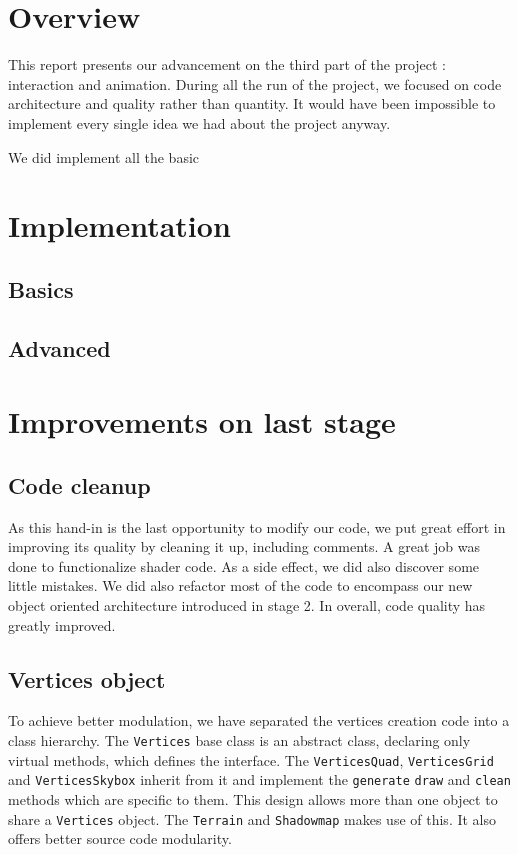 \documentclass[a4paper,11pt]{article}
\begin{document}
\section{Overview}

This report presents our advancement on the third part of the project : interaction and animation. During all the run of the project, we focused on code architecture and quality rather than quantity. It would have been impossible to implement every single idea we had about the project anyway.

We did implement all the basic

\section{Implementation}

\subsection{Basics}

\subsection{Advanced}


\section{Improvements on last stage}

\subsection{Code cleanup}

As this hand-in is the last opportunity to modify our code, we put great effort in improving its quality by cleaning it up, including comments. A great job was done to functionalize shader code. As a side effect, we did also discover some little mistakes. We did also refactor most of the code to encompass our new object oriented architecture introduced in stage 2. In overall, code quality has greatly improved.

\subsection{Vertices object}

To achieve better modulation, we have separated the vertices creation code into a class hierarchy. The \texttt{Vertices} base class is an abstract class, declaring only virtual methods, which defines the interface. The \texttt{VerticesQuad}, \texttt{VerticesGrid} and \texttt{VerticesSkybox} inherit from it and implement the \texttt{generate} \texttt{draw} and \texttt{clean} methods which are specific to them. This design allows more than one  object to share a \texttt{Vertices} object. The \texttt{Terrain} and \texttt{Shadowmap} makes use of this. It also offers better source code modularity.
\end{document}
